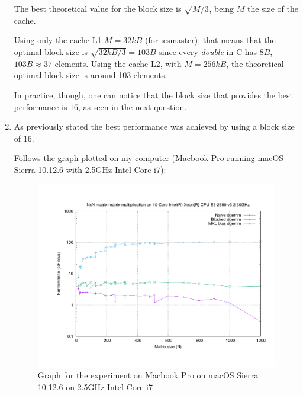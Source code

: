 \documentclass[unicode,11pt,a4paper,oneside,numbers=endperiod,openany]{scrartcl}
\begin{document}
\begin{enumerate}
            The best theoretical value for the block size is $\sqrt{M/3}$, being $M$ the size of the cache.

            Using only the cache L1 $M = 32kB$ (for icsmaster), that means that the optimal block size is $\sqrt{32kB/3} = 103B$ since every \textit{double} in C has $8B$, $103B \approx 37$ elements.
            Using the cache L2, with $M = 256kB$, the theoretical optimal block size is around 103 elements.

            In practice, though, one can notice that the block size that provides the best performance is $16$, as seen in the next question.


        \item  %
            As previously stated the best performance was achieved by using a block size of $16$.

            Follows the graph plotted on my computer (Macbook Pro running macOS Sierra 10.12.6 with 2.5GHz Intel Core i7):

            \begin{figure}[H]
                \includegraphics[width=.8\linewidth]{timing_mac}
                \caption{Graph for the experiment on Macbook Pro on macOS Sierra 10.12.6 on 2.5GHz Intel Core i7}
                \label{timing_mac}
            \end{figure}


\end{enumerate}
\end{document}
